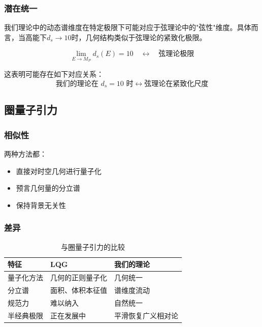 \subsubsection{潜在统一}

我们理论中的动态谱维度在特定极限下可能对应于弦理论中的"弦性"维度。具体而言，当高能下$d_s \to 10$时，几何结构类似于弦理论的紧致化极限。

\begin{equation}
    \lim_{E \to M_P} d_s(E) = 10 \quad \leftrightarrow \quad \text{弦理论极限}
\end{equation}

这表明可能存在如下对应关系：
\begin{equation}
    \text{我们的理论在 } d_s = 10 \text{ 时} \longleftrightarrow \text{弦理论在紧致化尺度}
\end{equation}

\subsection{圈量子引力}

\subsubsection{相似性}

两种方法都：
\begin{itemize}
    \item 直接对时空几何进行量子化
    \item 预言几何量的分立谱
    \item 保持背景无关性
\end{itemize}

\subsubsection{差异}

\begin{table}[htbp]
\centering
\caption{与圈量子引力的比较}
\label{tab:lqg_comparison}
\begin{tabular}{p{4cm}p{4cm}p{4cm}}
\hline
\textbf{特征} & \textbf{LQG} & \textbf{我们的理论} \\
\hline
量子化方法 & 几何的正则量子化 & 几何统一 \\
分立谱 & 面积、体积本征值 & 谱维度流动 \\
规范力 & 难以纳入 & 自然统一 \\
半经典极限 & 正在发展中 & 平滑恢复广义相对论 \\
\hline
\end{tabular}
\end{table}

